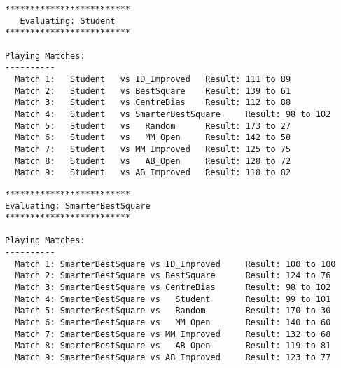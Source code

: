 \documentclass{article}
\begin{document}
\begin{lstlisting}
*************************
   Evaluating: Student   
*************************

Playing Matches:
----------
  Match 1:   Student   vs ID_Improved 	Result: 111 to 89
  Match 2:   Student   vs BestSquare  	Result: 139 to 61
  Match 3:   Student   vs CentreBias  	Result: 112 to 88
  Match 4:   Student   vs SmarterBestSquare 	Result: 98 to 102
  Match 5:   Student   vs   Random    	Result: 173 to 27
  Match 6:   Student   vs   MM_Open   	Result: 142 to 58
  Match 7:   Student   vs MM_Improved 	Result: 125 to 75
  Match 8:   Student   vs   AB_Open   	Result: 128 to 72
  Match 9:   Student   vs AB_Improved 	Result: 118 to 82

\end{lstlisting}
\begin{lstlisting}
*************************
Evaluating: SmarterBestSquare
*************************

Playing Matches:
----------
  Match 1: SmarterBestSquare vs ID_Improved 	Result: 100 to 100
  Match 2: SmarterBestSquare vs BestSquare  	Result: 124 to 76
  Match 3: SmarterBestSquare vs CentreBias  	Result: 98 to 102
  Match 4: SmarterBestSquare vs   Student   	Result: 99 to 101
  Match 5: SmarterBestSquare vs   Random    	Result: 170 to 30
  Match 6: SmarterBestSquare vs   MM_Open   	Result: 140 to 60
  Match 7: SmarterBestSquare vs MM_Improved 	Result: 132 to 68
  Match 8: SmarterBestSquare vs   AB_Open   	Result: 119 to 81
  Match 9: SmarterBestSquare vs AB_Improved 	Result: 123 to 77
\end{lstlisting}
\end{document}
